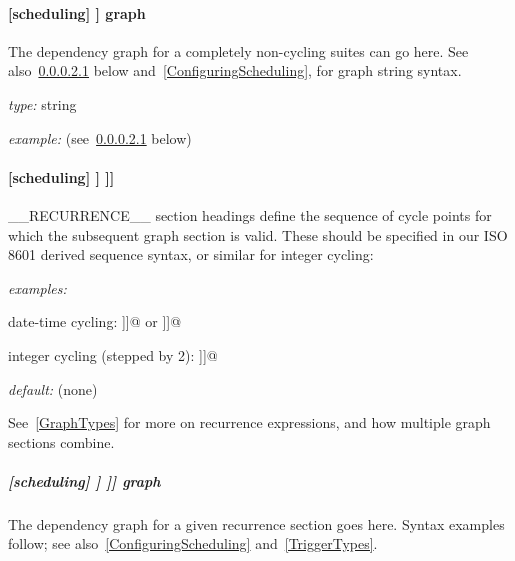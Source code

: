\paragraph[graph]{ [scheduling] \textrightarrow [[dependencies]] \textrightarrow graph }

The dependency graph for a completely non-cycling suites can go here.
See also~\ref{GraphDescrip} below and~\ref{ConfiguringScheduling}, for graph
string syntax.
\begin{myitemize}
    \item {\em type:} string
    \item {\em example:} (see~\ref{GraphDescrip} below)
\end{myitemize}

\paragraph[{[[[}\_\_RECURRENCE\_\_{]]]}]{[scheduling] \textrightarrow [[dependencies]] \textrightarrow [[[\_\_RECURRENCE\_\_]]]}

\_\_RECURRENCE\_\_ section headings define the sequence of cycle points for
which the subsequent graph section is valid. These should be specified in
our ISO 8601 derived sequence syntax, or similar for integer cycling:
\begin{myitemize}
    \item {\em examples:}
        \begin{myitemize}
            \item date-time cycling:
                \lstinline@[[[T00,T06,T12,T18]]]@ or \lstinline@[[[PT6H]]]@
            \item integer cycling (stepped by 2):
                \lstinline@[[[P2]]]@
        \end{myitemize}
    \item {\em default:} (none)
\end{myitemize}

See~\ref{GraphTypes} for more on recurrence expressions, and how multiple graph
sections combine.

\subparagraph[graph]{[scheduling] \textrightarrow [[dependencies]] \textrightarrow [[[\_\_RECURRENCE\_\_]]] \textrightarrow graph }
\label{GraphDescrip}

The dependency graph for a given recurrence section goes here. Syntax examples
follow; see also~\ref{ConfiguringScheduling} and~\ref{TriggerTypes}.

